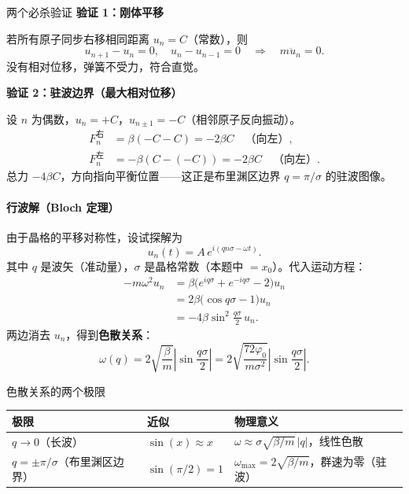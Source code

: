 \begin{tipbox}{两个必杀验证}
\textbf{验证 1：刚体平移}

若所有原子同步右移相同距离 $u_n = C$（常数），则
\[
  u_{n+1}-u_n = 0, \quad u_n-u_{n-1} = 0 \quad\Longrightarrow\quad m\ddot{u}_n = 0.
\]
没有相对位移，弹簧不受力，符合直觉。

\textbf{验证 2：驻波边界（最大相对位移）}

设 $n$ 为偶数，$u_n = +C$，$u_{n\pm 1} = -C$（相邻原子反向振动）。
\begin{align*}
  F_n^{\text{右}} &= \beta(-C - C) = -2\beta C \quad \text{（向左）}, \\
  F_n^{\text{左}} &= -\beta(C - (-C)) = -2\beta C \quad \text{（向左）}.
\end{align*}
总力 $-4\beta C$，方向指向平衡位置——这正是布里渊区边界 $q=\pi/\sigma$ 的驻波图像。
\end{tipbox}

\paragraph{行波解（Bloch 定理）}

由于晶格的平移对称性，设试探解为
\[
  u_n(t) = A\, e^{i(qn\sigma - \omega t)}.
\]
其中 $q$ 是波矢（准动量），$\sigma$ 是晶格常数（本题中 $=x_0$）。代入运动方程：
\begin{align*}
  -m\omega^2 u_n &= \beta\bigl(e^{iq\sigma} + e^{-iq\sigma} - 2\bigr) u_n \\
                 &= 2\beta\bigl(\cos q\sigma - 1\bigr) u_n \\
                 &= -4\beta\sin^2\frac{q\sigma}{2}\, u_n.
\end{align*}
两边消去 $u_n$，得到\textbf{色散关系}：
\[
  \boxed{ \omega(q) = 2\sqrt{\frac{\beta}{m}} \left|\sin\frac{q\sigma}{2}\right| }
  = 2\sqrt{\frac{72\varphi_0}{m\sigma^2}} \left|\sin\frac{q\sigma}{2}\right|.
\]

\begin{tipbox}{色散关系的两个极限}
\begin{center}
\renewcommand{\arraystretch}{1.5}
\begin{tabular}{|l|l|l|}
\hline
\textbf{极限} & \textbf{近似} & \textbf{物理意义} \\
\hline
$q \to 0$（长波） & $\sin(x) \approx x$ & $\omega \approx \sigma\sqrt{\beta/m}\,|q|$，线性色散 \\
$q = \pm \pi/\sigma$（布里渊区边界） & $\sin(\pi/2)=1$ & $\omega_{\max} = 2\sqrt{\beta/m}$，群速为零（驻波） \\
\hline
\end{tabular}
\end{center}
\end{tipbox}

